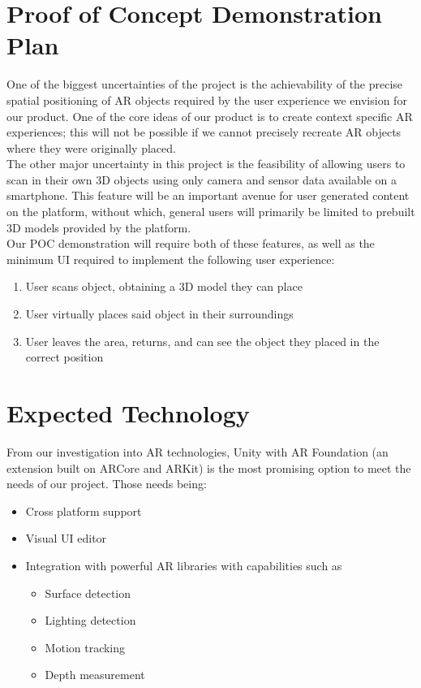 \documentclass{article}
\begin{document}

\section{Proof of Concept Demonstration Plan}

One of the biggest uncertainties of the project is the achievability of 
the precise spatial positioning of AR objects required by the user experience we envision for our product. 
One of the core ideas of our product is to create context specific AR experiences; 
this will not be possible if we cannot precisely recreate AR objects where they were originally placed.\\

The other major uncertainty in this project is the feasibility of 
allowing users to scan in their own 3D objects using only camera and sensor data available on a smartphone. 
This feature will be an important avenue for user generated content on the platform, 
without which, general users will primarily be limited to prebuilt 3D models provided by the platform.\\

Our POC demonstration will require both of these features, 
as well as the minimum UI required to implement the following user experience:\\

\begin{enumerate}
  \item User scans object, obtaining a 3D model they can place
  \item User virtually places said object in their surroundings
  \item User leaves the area, returns, and can see the object they placed in the correct position
\end{enumerate}


\section{Expected Technology}

From our investigation into AR technologies, Unity with AR Foundation (an extension built on ARCore and ARKit) is the most promising option to meet the needs of our project. Those needs being:
\begin{itemize}
  \item Cross platform support
  \item Visual UI editor
  \item Integration with powerful AR libraries with capabilities such as
  \begin{itemize}
        \item Surface detection
        \item Lighting detection
        \item Motion tracking
        \item Depth measurement
      \end{itemize}
\end{itemize}
\end{document}
